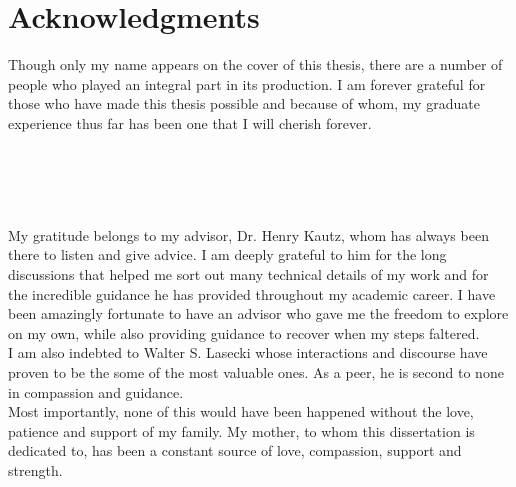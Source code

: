 \newpage                                             \chapter{Acknowledgments}

Though only my name appears on the cover of this thesis, there are a number of
people who played an integral part in its production. I am forever grateful for
those  who have made this thesis possible and because of whom, my graduate
experience thus far has been one that I will cherish forever.\\\\\\\\\


My gratitude belongs to my advisor, Dr. Henry Kautz, whom has always been there
to listen and give advice. I am deeply grateful to him for the long
discussions that helped me sort out many technical details of my work and for
the incredible guidance he has provided throughout my academic career. I have
been amazingly fortunate to have an advisor who gave me the freedom to explore
on my own, while also providing guidance to recover when my steps faltered.\\


I am also indebted to Walter S. Lasecki whose interactions and discourse have
proven to be the some of the most valuable ones.  As a peer, he is second to
none in compassion and guidance.\\

Most importantly, none of this would have been happened without the love,
patience and support of my family. My mother, to whom this dissertation is
dedicated to, has been a constant source of love, compassion, support and
strength.
